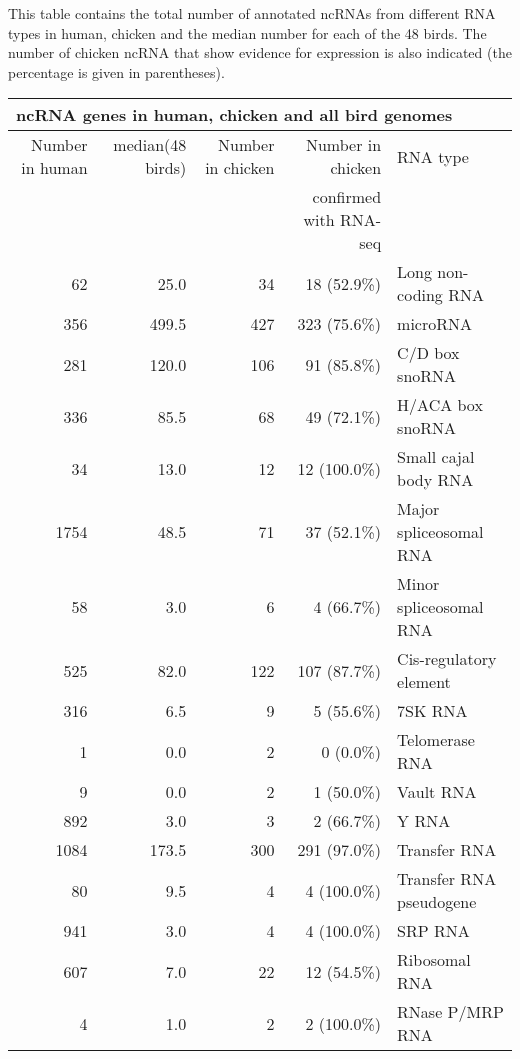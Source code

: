 \documentclass[10pt]{bmc_article}
\newenvironment{bmcformat}{\begin{raggedright}\baselineskip20pt\sloppy\setboolean{publ}{false}}{\end{raggedright}\baselineskip20pt\sloppy}
\begin{document}
\begin{bmcformat}
This table contains the total number of annotated ncRNAs from
different RNA types in human, chicken and the median number for each
of the 48 birds. The number of chicken ncRNA that show evidence for
expression is also indicated (the percentage is given in parentheses). 

\clearpage
\newpage

\begin{tabular}{|r|r|r|r|l|}
\hline 
\multicolumn{5}{|l|}{{\bf ncRNA genes in human, chicken and all bird genomes}}\\
\hline 
Number in human & median(48 birds) & Number in chicken & Number in chicken  & RNA type\\
                &            &                   & confirmed with RNA-seq & \\
\hline
62&25.0&34&18 (52.9\%)&Long non-coding RNA\\ 
356&499.5&427&323 (75.6\%)&microRNA\\ 
281&120.0&106&91 (85.8\%)&C/D box snoRNA\\ 
336&85.5&68&49 (72.1\%)&H/ACA box snoRNA\\ 
34&13.0&12&12 (100.0\%)&Small cajal body RNA\\ 
1754&48.5&71&37 (52.1\%)&Major spliceosomal RNA\\ 
58&3.0&6&4 (66.7\%)&Minor spliceosomal RNA\\ 
525&82.0&122&107 (87.7\%)&Cis-regulatory element\\ 
316&6.5&9&5 (55.6\%)&7SK RNA\\ 
1&0.0&2&0 (0.0\%)&Telomerase RNA\\ 
9&0.0&2&1 (50.0\%)&Vault RNA\\ 
892&3.0&3&2 (66.7\%)&Y RNA\\ 
1084&173.5&300&291 (97.0\%)&Transfer RNA\\ 
80&9.5&4&4 (100.0\%)&Transfer RNA pseudogene\\ 
941&3.0&4&4 (100.0\%)&SRP RNA\\ 
607&7.0&22&12 (54.5\%)&Ribosomal RNA\\ 
4&1.0&2&2 (100.0\%)&RNase P/MRP RNA\\ 
\hline
\end{tabular}







\end{bmcformat}
\end{document}
